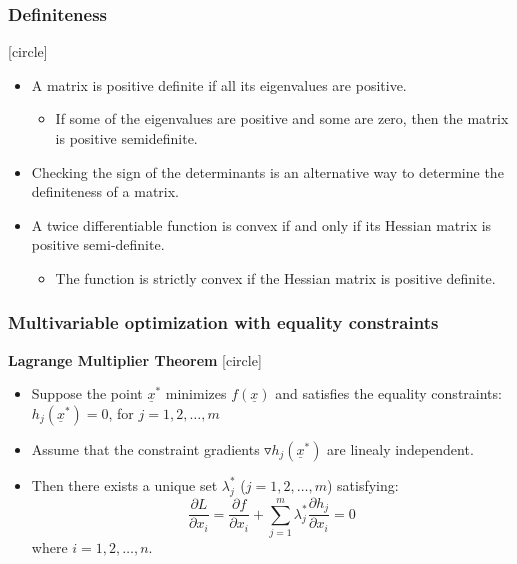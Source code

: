 \documentclass{beamer}
\begin{document}
\begin{frame}
    \frametitle{Definiteness}
    [circle]
    \begin{itemize}
        \item A matrix is positive definite if all its \alert{eigenvalues} are positive.
        \begin{itemize}
            \item If some of the eigenvalues are positive and some are zero, then the matrix is positive semidefinite.
        \end{itemize}
        \item \alert{Checking the sign of the determinants} is an alternative way to determine the definiteness of a matrix.
        \item A twice differentiable function is convex if and only if its Hessian matrix is positive
        semi-definite.
        \begin{itemize}
            \item The function is strictly convex if the Hessian matrix is positive definite.
        \end{itemize}
    \end{itemize}

\end{frame}
\begin{frame}
    \frametitle{Multivariable optimization with equality constraints}
    \textbf{Lagrange Multiplier Theorem}
    [circle]
    \begin{itemize}
        \item Suppose the point $\underline{x}^*$ minimizes $f(\underline{x})$ and satisfies the equality constraints: 
        $h_j(\underline{x}^*)=0$, for $j=1,2,\dots,m$
        \item Assume that the constraint gradients $\triangledown h_j(\underline{x}^*)$ are linealy independent.
        \item Then there exists a unique set $\lambda_j^*$ ($j=1,2,\dots,m$) satisfying:
        $$\frac{\partial L}{\partial x_i}=\frac{\partial f}{\partial x_i}+\sum^m_{j=1}\lambda_j^*\frac{\partial h_j}{\partial x_i}=0$$
        where $i=1,2,\dots,n$.
    \end{itemize}

\end{frame}
\end{document}
